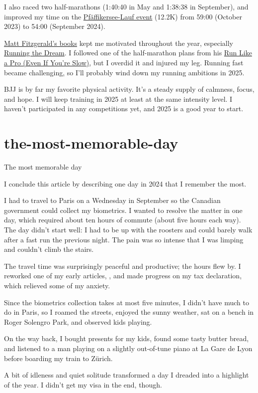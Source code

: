\documentclass{article}
\begin{document}
I also raced two half-marathons (1:40:40 in May and 1:38:38 in September), and improved my time on the \href{https://www.zuerilaufcup.ch/12-laeufe/pfaeffikersee-lauf}{Pfäffikersee-Lauf event} (12.2K) from 59:00 (October 2023) to 54:00 (September 2024).

\href{https://www.goodreads.com/author/show/99585.Matt_Fitzgerald}{Matt Fitzgerald's books} kept me motivated throughout the year, especially \href{https://www.goodreads.com/book/show/49342140-running-the-dream}{Running the Dream}.
I followed one of the half-marathon plans from his \href{https://www.goodreads.com/book/show/58284094-run-like-a-pro-even-if-you-re-slow}{Run Like a Pro (Even If You’re Slow)}, but I overdid it and injured my leg.
Running fast became challenging, so I'll probably wind down my running ambitions in 2025.

BJJ is by far my favorite physical activity.
It's a steady supply of calmness, focus, and hope.
I will keep training in 2025 at least at the same intensity level.
I haven't participated in any competitions yet, and 2025 is a good year to start.

\section{the-most-memorable-day}{The most memorable day}

I conclude this article by describing one day in 2024 that I remember the most.

I had to travel to Paris on a Wednesday in September so the Canadian government could collect my biometrics.
I wanted to resolve the matter in one day, which required about ten hours of commute (about five hours each way).
The day didn't start well: I had to be up with the roosters and could barely walk after a fast run the previous night.
The pain was so intense that I was limping and couldn’t climb the stairs.

The travel time was surprisingly peaceful and productive; the hours flew by.
I reworked one of my early articles, , and made progress on my tax declaration, which relieved some of my anxiety.

Since the biometrics collection takes at most five minutes,
I didn't have much to do in Paris,
so I roamed the streets,
enjoyed the sunny weather,
sat on a bench in Roger Solengro Park,
and observed kids playing.

On the way back,
I bought presents for my kids, found some tasty butter bread, and listened to a man playing on a slightly out-of-tune piano at La Gare de Lyon before boarding my train to Zürich.

A bit of idleness and quiet solitude transformed a day I dreaded into a highlight of the year.
I didn't get my visa in the end, though.
\end{document}
